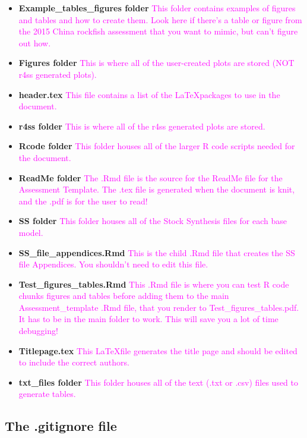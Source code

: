 \documentclass[12pt,]{article}
\begin{document}
\begin{itemize}
\item
  \textbf{Example\_tables\_figures folder}
  \textcolor{magenta}{This folder contains examples of figures and tables and how to create them.  Look here if there's a table or figure from the 2015 China rockfish assessment that you want to mimic, but can't figure out how.}
\item
  \textbf{Figures folder}
  \textcolor{magenta}{This is where all of the user-created plots are stored (NOT r4ss generated plots).}
\item
  \textbf{header.tex}
  \textcolor{magenta}{This file contains a list of the \LaTeX packages to use in the document.}
\item
  \textbf{r4ss folder}
  \textcolor{magenta}{This is where all of the r4ss generated plots are stored.}
\item
  \textbf{Rcode folder}
  \textcolor{magenta}{This folder houses all of the larger R code scripts needed for the document.}
\item
  \textbf{ReadMe folder}
  \textcolor{magenta}{The .Rmd file is the source for the ReadMe file for the Assessment Template.  The .tex file is generated when the document is knit, and the .pdf is for the user to read!}
\item
  \textbf{SS folder}
  \textcolor{magenta}{This folder houses all of the Stock Synthesis files for each base model.}
\item
  \textbf{SS\_file\_appendices.Rmd}
  \textcolor{magenta}{This is the child .Rmd file that creates the SS file Appendices.  You shouldn't need to edit this file.}
\item
  \textbf{Test\_figures\_tables.Rmd}
  \textcolor{magenta}{This .Rmd file is where you can test R code chunks figures and tables before adding them to the main Assessment\_template .Rmd file, that you render to Test\_figures\_tables.pdf.  It has to be in the main folder to work.  This will save you a lot of time debugging!}
\item
  \textbf{Titlepage.tex}
  \textcolor{magenta}{This \LaTeX file generates the title page and should be edited to include the correct authors.}
\item
  \textbf{txt\_files folder }
  \textcolor{magenta}{This folder houses all of the text (.txt or .csv) files used to generate tables.}
\end{itemize}

\subsection{The .gitignore file}\label{the-.gitignore-file}
\end{document}
